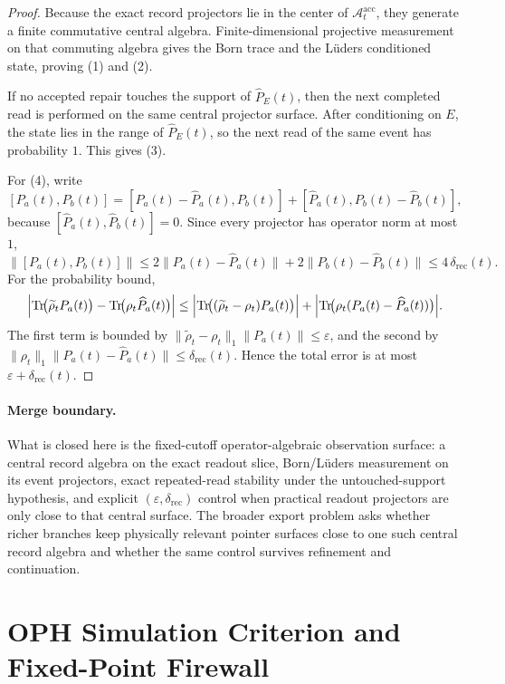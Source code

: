 \documentclass[11pt]{article}
\theoremstyle{remark}
\theoremstyle{plain}
\begin{document}
\begin{proof}
Because the exact record projectors lie in the center of \(\mathcal A_t^{\mathrm{acc}}\), they
generate a finite commutative central algebra. Finite-dimensional projective measurement on that
commuting algebra gives the Born trace and the L\"uders conditioned state, proving (1) and (2).

If no accepted repair touches the support of \(\widehat P_E(t)\), then the next completed read is
performed on the same central projector surface. After conditioning on \(E\), the state lies in
the range of \(\widehat P_E(t)\), so the next read of the same event has probability \(1\). This
gives (3).

For (4), write
\[
[P_a(t),P_b(t)]
=
[P_a(t)-\widehat P_a(t),P_b(t)]
+
[\widehat P_a(t),P_b(t)-\widehat P_b(t)],
\]
because \([\widehat P_a(t),\widehat P_b(t)]=0\). Since every projector has operator norm at most
\(1\),
\[
\|[P_a(t),P_b(t)]\|
\le
2\|P_a(t)-\widehat P_a(t)\|
+
2\|P_b(t)-\widehat P_b(t)\|
\le
4\,\delta_{\mathrm{rec}}(t).
\]
For the probability bound,
\[
\Bigl|
\operatorname{Tr}\!\bigl(\widetilde\rho_t P_a(t)\bigr)
-
\operatorname{Tr}\!\bigl(\rho_t \widehat P_a(t)\bigr)
\Bigr|
\le
\Bigl|\operatorname{Tr}\!\bigl((\widetilde\rho_t-\rho_t)P_a(t)\bigr)\Bigr|
+
\Bigl|\operatorname{Tr}\!\bigl(\rho_t(P_a(t)-\widehat P_a(t))\bigr)\Bigr|.
\]
The first term is bounded by \(\|\widetilde\rho_t-\rho_t\|_1\|P_a(t)\|\le \varepsilon\), and the
second by \(\|\rho_t\|_1\|P_a(t)-\widehat P_a(t)\|\le \delta_{\mathrm{rec}}(t)\). Hence the total
error is at most \(\varepsilon+\delta_{\mathrm{rec}}(t)\).
\end{proof}

\paragraph{Merge boundary.}
What is closed here is the fixed-cutoff operator-algebraic observation surface: a central record
algebra on the exact readout slice, Born/L\"uders measurement on its event projectors, exact
repeated-read stability under the untouched-support hypothesis, and explicit
\((\varepsilon,\delta_{\mathrm{rec}})\) control when practical readout projectors are only close
to that central surface. The broader export problem asks whether richer branches keep physically
relevant pointer surfaces close to one such central record algebra and whether the same control
survives refinement and continuation.

\section{OPH Simulation Criterion and Fixed-Point Firewall}
\label{sec:oph-simulation}
\end{document}
